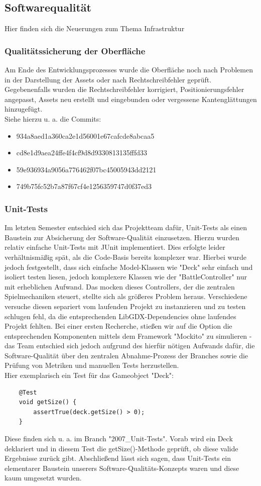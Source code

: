 \subsection{Softwarequalität}
Hier finden sich die Neuerungen zum Thema Infrastruktur

\subsubsection{Qualitätssicherung der Oberfläche}
Am Ende des Entwicklungsprozesses wurde die Oberfläche noch nach Problemen in der Darstellung der Assets oder nach Rechtschreibfehler geprüft. Gegebenenfalls wurden die Rechtschreibfehler korrigiert, Positionierungsfehler angepasst, Assets neu erstellt und eingebunden oder vergessene Kantenglättungen hinzugefügt. \\
Siehe hierzu u. a. die Commits: 
\begin{itemize}
\item 934a8aed1a360ca2e1d56001e67cafcde8abcaa5
\item cd8e1d9aea24ffe4f4cf9d8d9330813135fffd33
\item 59e936934a9056a776462f07bc45005943dd2121
\item 749b75fc52b7a87f67cf4e1256359747d0f37ed3
\end{itemize}

\subsubsection{Unit-Tests}
Im letzten Semester entschied sich das Projektteam dafür, Unit-Tests als einen Baustein zur Absicherung der Software-Qualität einzusetzen. Hierzu wurden relativ einfache Unit-Tests mit JUnit implementiert. Dies erfolgte leider verhältnismäßig spät, als die Code-Basis bereits komplexer war. Hierbei wurde jedoch festgestellt, dass sich einfache Model-Klassen wie "Deck" sehr einfach und isoliert testen liesen, jedoch komplexere Klassen wie der "BattleController" nur mit erheblichen Aufwand. Das mocken dieses Controllers, der die zentralen Spielmechaniken steuert, stellte sich als größeres Problem heraus. Verschiedene versuche diesen separiert vom laufenden Projekt zu instanzieren und zu testen schlugen fehl, da die entsprechenden LibGDX-Dependencies ohne laufendes Projekt fehlten. Bei einer ersten Recherche, stießen wir auf die Option die entsprechenden Komponenten mittels dem Framework "Mockito" zu simulieren - das Team entschied sich jedoch aufgrund des hierfür nötigen Aufwands dafür, die Software-Qualität über den zentralen Abnahme-Prozess der Branches sowie die Prüfung von Metriken und manuellen Tests herzustellen. \\
Hier exemplarisch ein Test für das Gameobject "Deck":
\begin{lstlisting}
    @Test
    void getSize() {
        assertTrue(deck.getSize() > 0);
    }
\end{lstlisting}
Diese finden sich u. a. im Branch "2007\_Unit-Tests".
Vorab wird ein Deck deklariert und in diesem Test die getSize()-Methode geprüft, ob diese valide Ergebnisse zurück gibt. Abschließend lässt sich sagen, dass Unit-Tests ein elementarer Baustein unserers Software-Qualitäts-Konzepts waren und diese kaum umgesetzt wurden. 

